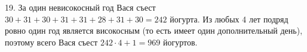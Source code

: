 19. За один невисокосный год Вася съест $30+31+30+31+31+28+31+30=242$ йогурта. Из любых 4 лет подряд ровно один год является високосным (то есть имеет один дополнительный день), поэтому всего Вася съест $242\cdot4+1=969$ йогуртов.\\
